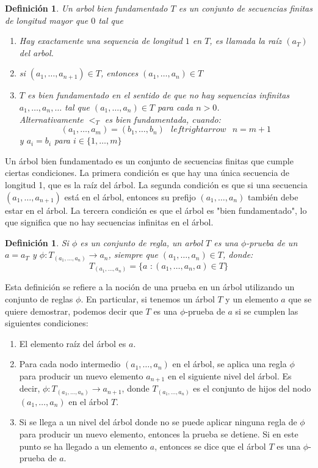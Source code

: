 \documentclass[executivepaper]{article}
\newtheorem{defi}[propo]{Definición}
\begin{document}
\begin{defi}
    Un arbol bien fundamentado $T$ es un conjunto de secuencias finitas de longitud mayor que $0$ tal que
    \begin{enumerate}
        \item Hay exactamente una sequencia de longitud $1$ en $T$, es llamada la raíz $(a_{T})$ del arbol.
        \item si $(a_1,\ldots,a_{n+1})\in T$, entonces $(a_1,\ldots,a_{n})\in T$
        \item $T$ es bien fundamentado en el sentido de que no hay sequencias infinitas $a_1,\ldots,a_n,\ldots$ tal que $(a_1,\ldots,a_{n})\in T$ para cada $n>0$.\\
        Alternativamente $<_T$ es bien fundamentada, cuando:
        $$(a_1,\ldots,a_{m}) = (b_1,\ldots,b_{n}) \,\,\,\ leftrightarrow \,\,\,\ n = m+1$$
        y $a_i = b_i$ para $i\in\{1,\ldots, m\}$
    \end{enumerate}
\end{defi}
Un árbol bien fundamentado es un conjunto de secuencias finitas que cumple ciertas condiciones. La primera condición es que hay una única secuencia de longitud 1, que es la raíz del árbol. La segunda condición es que si una secuencia $(a_1,\ldots,a_{n+1})$ está en el árbol, entonces su prefijo $(a_1,\ldots,a_n)$ también debe estar en el árbol. La tercera condición es que el árbol es "bien fundamentado", lo que significa que no hay secuencias infinitas en el árbol.

\begin{defi}
    Si $\phi$ es un conjunto de regla, un arbol $T$ es una $\phi$-prueba de un $a = a_T$ y $\phi: T_{(a_1,\ldots,a_{n})}\rightarrow a_n$, siempre que $(a_1,\ldots,a_{n})\in T$, donde:
    $$T_{(a_1,\ldots,a_{n})} = \{a \,\, : (a_1,\ldots,a_{n},a) \in T\}$$
\end{defi}
Esta definición se refiere a la noción de una prueba en un árbol utilizando un conjunto de reglas $\phi$. En particular, si tenemos un árbol $T$ y un elemento $a$ que se quiere demostrar, podemos decir que $T$ es una $\phi$-prueba de $a$ si se cumplen las siguientes condiciones:
\begin{enumerate}
    \item El elemento raíz del árbol es $a$.
    \item Para cada nodo intermedio $(a_1,\ldots,a_n)$ en el árbol, se aplica una regla $\phi$ para producir un nuevo elemento $a_{n+1}$ en el siguiente nivel del árbol. Es decir, $\phi: T_{(a_1,\ldots,a_n)}\rightarrow a_{n+1}$, donde $T_{(a_1,\ldots,a_n)}$ es el conjunto de hijos del nodo $(a_1,\ldots,a_n)$ en el árbol $T$.
    \item Si se llega a un nivel del árbol donde no se puede aplicar ninguna regla de $\phi$ para producir un nuevo elemento, entonces la prueba se detiene. Si en este punto se ha llegado a un elemento $a$, entonces se dice que el árbol $T$ es una $\phi$-prueba de $a$.
\end{enumerate}
\end{document}
